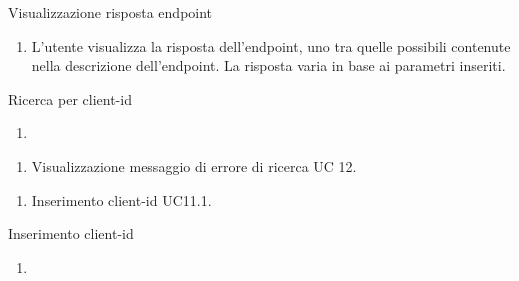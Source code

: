 \begin{usecase}{10}{Visualizzazione risposta endpoint}\label{uc:visualizzazione-risposta-endpoint}

    \usecasemain{}
        \begin{enumerate}
            \item L'utente visualizza la risposta dell'endpoint, uno tra quelle possibili contenute nella descrizione dell'endpoint. La risposta varia in base ai parametri inseriti.
        \end{enumerate}

\end{usecase}


\begin{usecase}{11}{Ricerca per client-id}\label{uc:ricerca-client-id}
    \usecasepre{}
    \usecasedesc{}
    \usecasepost{}

    \usecasemain{}
        \begin{enumerate}
            \item 
        \end{enumerate}

    \usecaseext{}
        \begin{enumerate}
            \item Visualizzazione messaggio di errore di ricerca UC 12.
        \end{enumerate}

    \usecasegen{}
        \begin{enumerate}
            \item Inserimento client-id UC11.1.
        \end{enumerate}

\end{usecase}


\begin{usecase}{11.1}{Inserimento client-id}\label{uc:}
    \usecasepre{}
    \usecasedesc{}
    \usecasepost{}

    \usecasemain{}
        \begin{enumerate}
            \item 
        \end{enumerate}

\end{usecase}


